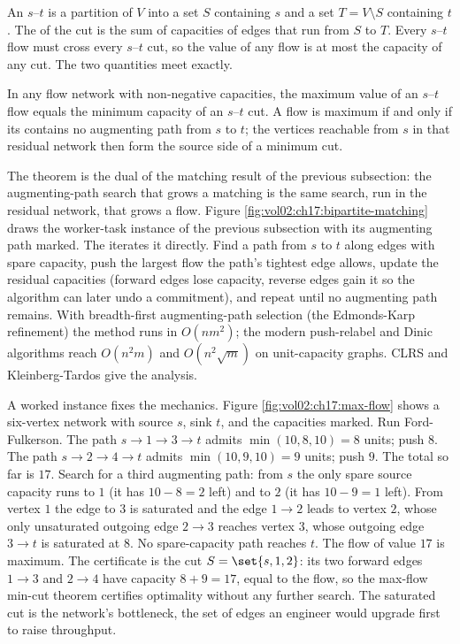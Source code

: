 An $s$--$t$  is a partition of $V$ into a set $S$
containing $s$ and a set $T = V \setminus S$ containing $t$. The
 of the cut is the sum of capacities of edges that
run from $S$ to $T$. Every $s$--$t$ flow must cross every $s$--$t$
cut, so the value of any flow is at most the capacity of any cut.
The two quantities meet exactly.

\begin{principle}
In any flow network with non-negative capacities, the maximum value
of an $s$--$t$ flow equals the minimum capacity of an $s$--$t$ cut.
A flow is maximum if and only if its 
contains no augmenting path from $s$ to $t$; the vertices reachable
from $s$ in that residual network then form the source side of a
minimum cut.
\end{principle}

The theorem is the dual of the matching result of the previous
subsection: the augmenting-path search that grows a matching is the
same search, run in the residual network, that grows a flow. Figure
\ref{fig:vol02:ch17:bipartite-matching} draws the worker-task
instance of the previous subsection with its augmenting path marked.
The
 iterates it directly. Find a path
from $s$ to $t$ along edges with spare capacity, push the largest
flow the path's tightest edge allows, update the residual capacities
(forward edges lose capacity, reverse edges gain it so the algorithm
can later undo a commitment), and repeat until no augmenting path
remains. With breadth-first augmenting-path selection (the
Edmonds-Karp refinement) the method runs in $O(n m^{2})$; the
modern push-relabel and Dinic algorithms reach $O(n^{2} m)$ and
$O(n^{2} \sqrt{m})$ on unit-capacity graphs. CLRS
\cite{text:cormen-clrs} and Kleinberg-Tardos
\cite{text:kleinberg-tardos} give the analysis.

A worked instance fixes the mechanics. Figure
\ref{fig:vol02:ch17:max-flow} shows a six-vertex network with source
$s$, sink $t$, and the capacities marked. Run Ford-Fulkerson.
The path $s \to 1 \to 3 \to t$ admits $\min(10, 8, 10) = 8$ units;
push $8$. The path $s \to 2 \to 4 \to t$ admits $\min(10, 9, 10) =
9$ units; push $9$. The total so far is $17$. Search for a third
augmenting path: from $s$ the only spare source capacity runs to $1$
(it has $10 - 8 = 2$ left) and to $2$ (it has $10 - 9 = 1$ left).
From vertex $1$ the edge to $3$ is saturated and the edge $1 \to 2$
leads to vertex $2$, whose only unsaturated outgoing edge $2 \to 3$
reaches vertex $3$, whose outgoing edge $3 \to t$ is saturated at
$8$. No spare-capacity path reaches $t$. The flow of value $17$ is
maximum. The certificate is the cut $S = \set{s, 1, 2}$: its two
forward edges $1 \to 3$ and $2 \to 4$ have capacity $8 + 9 = 17$,
equal to the flow, so the max-flow min-cut theorem certifies
optimality without any further search. The saturated cut is the
network's bottleneck, the set of edges an engineer would upgrade
first to raise throughput.

